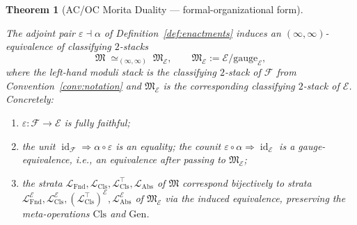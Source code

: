 \documentclass[11pt]{article}
\theoremstyle{plain}
\newtheorem{theorem}{Theorem}[section]
\theoremstyle{definition}
\newcommand{\cF}{\mathcal{F}}
\newcommand{\fM}{\mathfrak{M}}
\newcommand{\LFnd}{\mathcal{L}_{\mathrm{Fnd}}}
\newcommand{\LCls}{\mathcal{L}_{\mathrm{Cls}}}
\newcommand{\LClsMax}{\mathcal{L}_{\mathrm{Cls}}^{\top}}
\newcommand{\LAbs}{\mathcal{L}_{\mathrm{Abs}}}
\newcommand{\cE}{\mathcal{E}}
\DeclareMathOperator{\id}{id}
\begin{document}
\begin{theorem}[AC/OC Morita Duality --- formal-organizational form]\label{thm:ac-oc-duality}

The adjoint pair $\varepsilon \dashv \alpha$ of Definition~\ref{def:enactments} induces an $(\infty, \infty)$-equivalence of classifying $2$-stacks
\[
  \fM \;\simeq_{(\infty, \infty)}\; \fM_\cE, \qquad \fM_\cE := \cE / \mathrm{gauge}_\cE,
\]
where the left-hand moduli stack is the classifying $2$-stack of $\cF$ from Convention~\ref{conv:notation} and $\fM_\cE$ is the corresponding classifying $2$-stack of $\cE$. Concretely:
\begin{enumerate}[label=(\alph*)]
\item $\varepsilon : \cF \to \cE$ is fully faithful;
\item the unit $\id_\cF \Rightarrow \alpha \circ \varepsilon$ is an equality; the counit $\varepsilon \circ \alpha \Rightarrow \id_\cE$ is a gauge-equivalence, i.e., an equivalence after passing to $\fM_\cE$;
\item the strata $\LFnd, \LCls, \LClsMax, \LAbs$ of $\fM$ correspond bijectively to strata $\LFnd^\cE, \LCls^\cE, (\LClsMax)^\cE, \LAbs^\cE$ of $\fM_\cE$ via the induced equivalence, preserving the meta-operations $\mathrm{Cls}$ and $\mathrm{Gen}$.
\end{enumerate}
\end{theorem}
\end{document}
